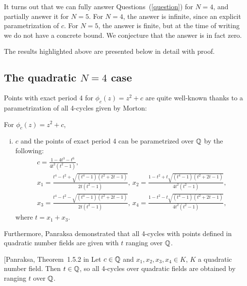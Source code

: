It turns out that we can fully answer Questions~(\ref{question}) for
$N = 4$, and partially answer it for $N = 5$. For $N = 4$, the answer
is infinite, since an explicit parametrization of $c$. For $N =
5$, the answer is finite, but at the time of writing we do not have a
concrete bound. We conjecture that the answer is in fact zero.

The results highlighted above are presented below in detail with
proof.

\subsection{The quadratic $N = 4$ case}

Points with exact period 4 for $\phi_c(z) = z^2 + c$ are quite 
well-known thanks to a parametrization of all 4-cycles given by
Morton:

\begin{theorem} 
  For $\phi_c(z) = z^2 + c$,
  \begin{enumerate}[(i)]
  \item $c$ and the points of exact period 4 can be parametrized over
    $\mathbb{Q}$ by the following:
    \[
    \begin{gathered}
      c = \frac{1 - 4t^3 - t^6}{4t^2(t^2 - 1)}, \\
      x_1 = \frac{t^4 - t^2 + \sqrt{(t^4 - 1)(t^2 + 2t - 1)}}{2t(t^2 -
        1)},\,
      x_2 = \frac{1 - t^2 + t \sqrt{(t^4 - 1)(t^2 + 2t - 1)}}{4t^2(t^2
        - 1)}, \\
      x_3 = \frac{t^4 - t^2 - \sqrt{(t^4 - 1)(t^2 + 2t - 1)}}{2t(t^2 -
        1)},\,
      x_4 = \frac{1 - t^2 - t \sqrt{(t^4 - 1)(t^2 + 2t - 1)}}{4t^2(t^2
        - 1)},
  \end{gathered}
  \]
  where $t = x_1 + x_3$.

  \end{enumerate}
\end{theorem}

Furthermore, Panraksa demonstrated that all 4-cycles with points
defined in quadratic number fields are given with $t$ ranging over
$\mathbb{Q}$.

\begin{theorem} [Panraksa, Theorem~1.5.2 in \cite{MR2982105}
	Let $c \in \mathbb{Q}$ and $x_1, x_2, x_3, x_4 \in K$, $K$ a quadratic 
	number field. Then $t \in \mathbb{Q}$, so all 4-cycles over quadratic
	fields are obtained by ranging $t$ over $\mathbb{Q}$.
\end{theorem}

